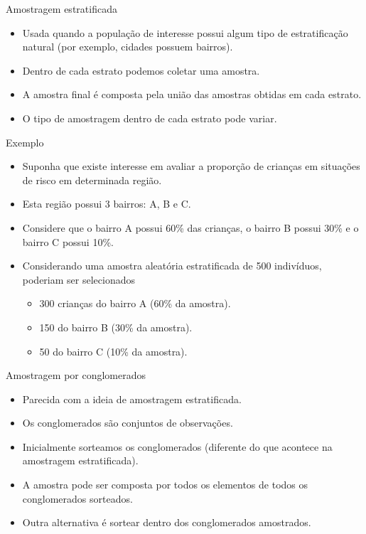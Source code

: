 \documentclass[
  ignorenonframetext,
  serif,
  professionalfont,
  usenames,
  dvipsnames,
  aspectratio = 169]{beamer}
\providecommand{\tightlist}{%
  \setlength{\itemsep}{0pt}\setlength{\parskip}{0pt}}
\renewcommand{\tightlist}{%
  \setlength{\itemsep}{0\baselineskip}
  \setlength{\parskip}{0.25\baselineskip}
}
\begin{document}
\begin{frame}{Amostragem estratificada}
\protect\hypertarget{amostragem-estratificada}{}
\begin{itemize}
\item
  Usada quando a população de interesse possui algum tipo de
  estratificação natural (por exemplo, cidades possuem bairros).
\item
  Dentro de cada estrato podemos coletar uma amostra.
\item
  A amostra final é composta pela união das amostras obtidas em cada
  estrato.
\item
  O tipo de amostragem dentro de cada estrato pode variar.
\end{itemize}
\end{frame}

\begin{frame}{Exemplo}
\protect\hypertarget{exemplo-2}{}
\begin{itemize}
\item
  Suponha que existe interesse em avaliar a proporção de crianças em
  situações de risco em determinada região.
\item
  Esta região possui 3 bairros: A, B e C.
\item
  Considere que o bairro A possui 60\% das crianças, o bairro B possui
  30\% e o bairro C possui 10\%.
\item
  Considerando uma amostra aleatória estratificada de 500 indivíduos,
  poderiam ser selecionados

  \begin{itemize}
  \tightlist
  \item
    300 crianças do bairro A (60\% da amostra).
  \item
    150 do bairro B (30\% da amostra).
  \item
    50 do bairro C (10\% da amostra).
  \end{itemize}
\end{itemize}
\end{frame}

\begin{frame}{Amostragem por conglomerados}
\protect\hypertarget{amostragem-por-conglomerados}{}
\begin{itemize}
\item
  Parecida com a ideia de amostragem estratificada.
\item
  Os conglomerados são conjuntos de observações.
\item
  Inicialmente sorteamos os conglomerados (diferente do que acontece na
  amostragem estratificada).
\item
  A amostra pode ser composta por todos os elementos de todos os
  conglomerados sorteados.
\item
  Outra alternativa é sortear dentro dos conglomerados amostrados.
\end{itemize}
\end{frame}
\end{document}
